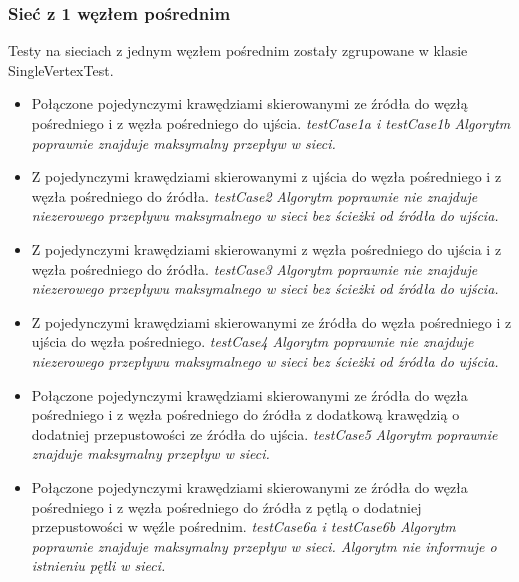\subsubsection{Sieć z 1 węzłem pośrednim}
Testy na sieciach z jednym węzłem pośrednim zostały zgrupowane
w klasie SingleVertexTest.
\begin{itemize}[nosep]
    \item Połączone pojedynczymi krawędziami skierowanymi ze źródła do węzłą
    pośredniego i z węzła pośredniego do ujścia.
    \emph{testCase1a i testCase1b}
    \emph{Algorytm poprawnie
    znajduje maksymalny przepływ w sieci.}

    \item Z pojedynczymi krawędziami skierowanymi z ujścia do węzła pośredniego
    i z węzła pośredniego do źródła.
    \emph{testCase2}
    \emph{Algorytm poprawnie nie znajduje niezerowego
    przepływu maksymalnego w sieci bez ścieżki od źródła do ujścia.}

    \item Z pojedynczymi krawędziami skierowanymi z węzła pośredniego do ujścia
    i z węzła pośredniego do źródła.
    \emph{testCase3}
    \emph{Algorytm poprawnie nie znajduje niezerowego
    przepływu maksymalnego w sieci bez ścieżki od źródła do ujścia.}

    \item Z pojedynczymi krawędziami skierowanymi ze źródła do węzła pośredniego
    i z ujścia do węzła pośredniego.
    \emph{testCase4}
    \emph{Algorytm poprawnie nie znajduje niezerowego
    przepływu maksymalnego w sieci bez ścieżki od źródła do ujścia.}

    \item Połączone pojedynczymi krawędziami skierowanymi ze źródła do węzła
    pośredniego i z węzła pośredniego do źródła z dodatkową krawędzią o
    dodatniej przepustowości ze źródła do ujścia.
    \emph{testCase5}
    \emph{Algorytm poprawnie znajduje maksymalny
    przepływ w sieci.}

    \item Połączone pojedynczymi krawędziami skierowanymi ze źródła do węzła
    pośredniego i z węzła pośredniego do źródła z pętlą o dodatniej
    przepustowości w węźle pośrednim.
    \emph{testCase6a i testCase6b}
    \emph{Algorytm poprawnie znajduje maksymalny
    przepływ w sieci. Algorytm nie informuje o istnieniu pętli w sieci.}


\end{itemize}
